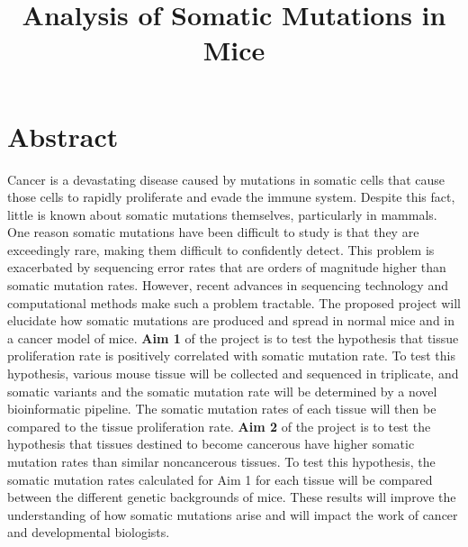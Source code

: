 \documentclass[12pt]{article}
\title{Analysis of Somatic Mutations in Mice}
\date{}
\begin{document}
\maketitle





\section{Abstract}

Cancer is a devastating disease caused by mutations in somatic cells that cause those cells to rapidly proliferate and evade the immune system.
Despite this fact, little is known about somatic mutations themselves, particularly in mammals.
One reason somatic mutations have been difficult to study is that they are exceedingly rare, making them difficult to confidently detect.
This problem is exacerbated by sequencing error rates that are orders of magnitude higher than somatic mutation rates.
However, recent advances in sequencing technology and computational methods make such a problem tractable.
The proposed project will elucidate how somatic mutations are produced and spread in normal mice and in a cancer model of mice.
\textbf{Aim 1} of the project is to test the hypothesis that tissue proliferation rate is positively correlated with somatic mutation rate.
To test this hypothesis, various mouse tissue will be collected and sequenced in triplicate, and somatic variants and the somatic mutation rate will be determined by a novel bioinformatic pipeline.
The somatic mutation rates of each tissue will then be compared to the tissue proliferation rate.
\textbf{Aim 2} of the project is to test the hypothesis that tissues destined to become cancerous have higher somatic mutation rates than similar noncancerous tissues.
To test this hypothesis, the somatic mutation rates calculated for Aim 1 for each tissue will be compared between the different genetic backgrounds of mice.
These results will improve the understanding of how somatic mutations arise and will impact the work of cancer and developmental biologists.
\end{document}
